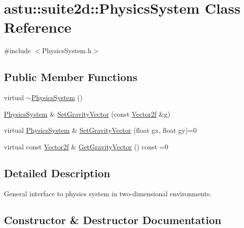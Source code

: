 \hypertarget{classastu_1_1suite2d_1_1PhysicsSystem}{}\section{astu\+:\+:suite2d\+:\+:Physics\+System Class Reference}
\label{classastu_1_1suite2d_1_1PhysicsSystem}


{\ttfamily \#include $<$Physics\+System.\+h$>$}

\subsection*{Public Member Functions}
\begin{DoxyCompactItemize}
\item 
virtual \hyperlink{classastu_1_1suite2d_1_1PhysicsSystem_afde349ca84687814c36cb4ba84a99ed1}{$\sim$\+Physics\+System} ()
\item 
\hyperlink{classastu_1_1suite2d_1_1PhysicsSystem}{Physics\+System} \& \hyperlink{classastu_1_1suite2d_1_1PhysicsSystem_a9c057ce72549ba65dc2a2b13f5cffc52}{Set\+Gravity\+Vector} (const \hyperlink{classastu_1_1Vector2}{Vector2f} \&g)
\item 
virtual \hyperlink{classastu_1_1suite2d_1_1PhysicsSystem}{Physics\+System} \& \hyperlink{classastu_1_1suite2d_1_1PhysicsSystem_a8f2d8df268662d355445f0120a7db412}{Set\+Gravity\+Vector} (float gx, float gy)=0
\item 
virtual const \hyperlink{classastu_1_1Vector2}{Vector2f} \& \hyperlink{classastu_1_1suite2d_1_1PhysicsSystem_a2c4175db5f8ea7174804e1d797ca5700}{Get\+Gravity\+Vector} () const =0
\end{DoxyCompactItemize}


\subsection{Detailed Description}
General interface to physics system in two-\/dimensional environments. 

\subsection{Constructor \& Destructor Documentation}
\mbox{\label{classastu_1_1suite2d_1_1PhysicsSystem_afde349ca84687814c36cb4ba84a99ed1}} 
